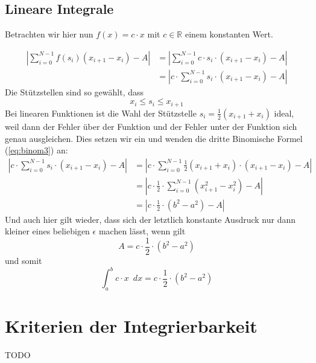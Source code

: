 \subsection{Lineare Integrale}

Betrachten wir hier nun $f(x) = c\cdot x$ mit $c\in \mathbb{R}$ einem konstanten Wert. 

\begin{equation}
\begin{split}
\left| \sum_{i=0}^{N-1} f(s_i)(x_{i+1}-x_i) -A \right| &= \left| \sum_{i=0}^{N-1} c\cdot s_i \cdot (x_{i+1}-x_i) -A \right| \\ 
&=\left|  c\cdot \sum_{i=0}^{N-1}s_i \cdot (x_{i+1}-x_i) -A \right|
\end{split}
\end{equation}
Die Stützstellen sind so gewählt, dass
\begin{equation}
x_i \le s_i \le x_{i+1}
\end{equation}
Bei linearen Funktionen ist die Wahl der Stützstelle $s_i = \frac{1}{2}(x_{i+1}+x_i)$ ideal, weil dann der Fehler über der Funktion und der Fehler unter der Funktion sich genau ausgleichen. Dies setzen wir ein und wenden die dritte Binomische Formel (\ref{eq:binom3}) an:
\begin{equation}
\begin{split}
\left|  c\cdot \sum_{i=0}^{N-1}s_i \cdot (x_{i+1}-x_i) -A \right| &= \left|  c\cdot \sum_{i=0}^{N-1} \frac{1}{2}(x_{i+1}+x_i) \cdot (x_{i+1}-x_i) -A \right|\\
&=\left|  c\cdot \frac{1}{2} \cdot \sum_{i=0}^{N-1} (x_{i+1}^2-x_i^2) -A \right|\\
&=\left|  c\cdot \frac{1}{2} \cdot (b^2-a^2) -A \right|
\end{split}
\end{equation}
Und auch hier gilt wieder, dass sich der letztlich konstante Ausdruck nur dann kleiner eines beliebigen $\epsilon$ machen lässt, wenn gilt
\begin{equation}
A = c\cdot \frac{1}{2} \cdot (b^2-a^2)
\end{equation}
und somit
\begin{equation}
\int_a^b c\cdot x \enspace dx = c\cdot \frac{1}{2} \cdot (b^2-a^2)
\end{equation}


\section{Kriterien der Integrierbarkeit}
TODO 

